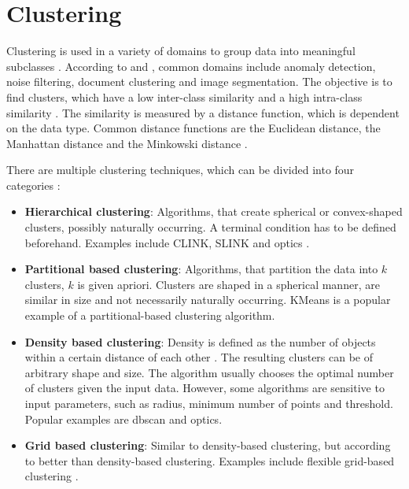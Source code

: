 \section{Clustering}\label{sec:clustering}

Clustering is used in a variety of domains to group data into meaningful subclasses \cite{OPTICS2013, OPTICS2014, OPTICS_kMeans_2016}.
According to \citeauthor{OPTICS2013} and \citeauthor{clusteringDocs2020}, common domains include anomaly detection, noise filtering, document clustering and image segmentation. 
The objective is to find clusters, which have a low inter-class similarity and a high intra-class similarity \cite{OPTICS2013}.
The similarity is measured by a distance function, which is dependent on the data type. 
Common distance functions are the Euclidean distance, the Manhattan distance and the Minkowski distance \cite{OPTICS_kMeans_2016}.

There are multiple clustering techniques, which can be divided into four categories \cite{OPTICS2016}: 
\begin{itemize}
    \item \textbf{Hierarchical clustering}:
    Algorithms, that create spherical or convex-shaped clusters, possibly naturally occurring. 
    A terminal condition has to be defined beforehand.
    Examples include CLINK, SLINK \cite{OPTICS2014} and \ac{optics} \cite{OPTICS2013}.

    \item \textbf{Partitional based clustering}: 
    Algorithms, that partition the data into $k$ clusters, $k$ is given apriori.
    Clusters are shaped in a spherical manner, are similar in size and not necessarily naturally occurring.
    KMeans is a popular example of a partitional-based clustering algorithm.

    \item \textbf{Density based clustering}:
    Density is defined as the number of objects within a certain distance of each other \cite{OPTICS_kMeans_2016}.
    The resulting clusters can be of arbitrary shape and size.
    The algorithm usually chooses the optimal number of clusters given the input data.
    However, some algorithms are sensitive to input parameters, such as radius, minimum number of points and threshold.
    Popular examples are \ac{dbscan} and \ac{optics}.
    
    \item \textbf{Grid based clustering}:
    Similar to density-based clustering, but according to \citeauthor{OPTICS2016} better than density-based clustering.
    Examples include flexible grid-based clustering \cite{OPTICS2014}.
    
\end{itemize}

